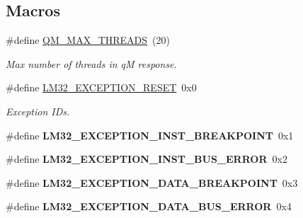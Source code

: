 \subsection*{Macros}
\begin{DoxyCompactItemize}
\item 
\mbox{\label{group__lm32__gdb_ga243f95627d5e272d7fec12c5b9431fb0}} 
\#define \mbox{\hyperlink{group__lm32__gdb_ga243f95627d5e272d7fec12c5b9431fb0}{Q\+M\+\_\+\+M\+A\+X\+\_\+\+T\+H\+R\+E\+A\+DS}}~(20)
\begin{DoxyCompactList}\small\item\em Max number of threads in qM response. \end{DoxyCompactList}\item 
\mbox{\label{group__lm32__gdb_gacea766655eff9b5ac266be0c59e741a1}} 
\#define \mbox{\hyperlink{group__lm32__gdb_gacea766655eff9b5ac266be0c59e741a1}{L\+M32\+\_\+\+E\+X\+C\+E\+P\+T\+I\+O\+N\+\_\+\+R\+E\+S\+ET}}~0x0
\begin{DoxyCompactList}\small\item\em Exception I\+Ds. \end{DoxyCompactList}\item 
\mbox{\label{group__lm32__gdb_ga8d18521f7c3cc93ada55ae0acd7ec3dc}} 
\#define {\bfseries L\+M32\+\_\+\+E\+X\+C\+E\+P\+T\+I\+O\+N\+\_\+\+I\+N\+S\+T\+\_\+\+B\+R\+E\+A\+K\+P\+O\+I\+NT}~0x1
\item 
\mbox{\label{group__lm32__gdb_ga04ba2007be6fae81638508de3960468f}} 
\#define {\bfseries L\+M32\+\_\+\+E\+X\+C\+E\+P\+T\+I\+O\+N\+\_\+\+I\+N\+S\+T\+\_\+\+B\+U\+S\+\_\+\+E\+R\+R\+OR}~0x2
\item 
\mbox{\label{group__lm32__gdb_ga365a30c2aa362dc24be525b0c13c8d6a}} 
\#define {\bfseries L\+M32\+\_\+\+E\+X\+C\+E\+P\+T\+I\+O\+N\+\_\+\+D\+A\+T\+A\+\_\+\+B\+R\+E\+A\+K\+P\+O\+I\+NT}~0x3
\item 
\mbox{\label{group__lm32__gdb_ga56cf782f2466b602e25976cfe0f9a404}} 
\#define {\bfseries L\+M32\+\_\+\+E\+X\+C\+E\+P\+T\+I\+O\+N\+\_\+\+D\+A\+T\+A\+\_\+\+B\+U\+S\+\_\+\+E\+R\+R\+OR}~0x4
\item 
\mbox{\label{group__lm32__gdb_ga3eabfcf05baf985ce1b97803d4b36f89}} 

\end{DoxyCompactItemize}
